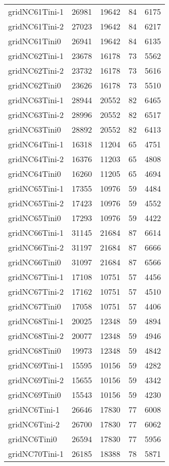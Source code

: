 \begin{longtable}{lrrrr}
gridNC61Tini-1 & 26981 & 19642 & 84 & 6175 \\
gridNC61Tini-2 & 27023 & 19642 & 84 & 6217 \\
gridNC61Tini0 & 26941 & 19642 & 84 & 6135 \\
gridNC62Tini-1 & 23678 & 16178 & 73 & 5562 \\
gridNC62Tini-2 & 23732 & 16178 & 73 & 5616 \\
gridNC62Tini0 & 23626 & 16178 & 73 & 5510 \\
gridNC63Tini-1 & 28944 & 20552 & 82 & 6465 \\
gridNC63Tini-2 & 28996 & 20552 & 82 & 6517 \\
gridNC63Tini0 & 28892 & 20552 & 82 & 6413 \\
gridNC64Tini-1 & 16318 & 11204 & 65 & 4751 \\
gridNC64Tini-2 & 16376 & 11203 & 65 & 4808 \\
gridNC64Tini0 & 16260 & 11205 & 65 & 4694 \\
gridNC65Tini-1 & 17355 & 10976 & 59 & 4484 \\
gridNC65Tini-2 & 17423 & 10976 & 59 & 4552 \\
gridNC65Tini0 & 17293 & 10976 & 59 & 4422 \\
gridNC66Tini-1 & 31145 & 21684 & 87 & 6614 \\
gridNC66Tini-2 & 31197 & 21684 & 87 & 6666 \\
gridNC66Tini0 & 31097 & 21684 & 87 & 6566 \\
gridNC67Tini-1 & 17108 & 10751 & 57 & 4456 \\
gridNC67Tini-2 & 17162 & 10751 & 57 & 4510 \\
gridNC67Tini0 & 17058 & 10751 & 57 & 4406 \\
gridNC68Tini-1 & 20025 & 12348 & 59 & 4894 \\
gridNC68Tini-2 & 20077 & 12348 & 59 & 4946 \\
gridNC68Tini0 & 19973 & 12348 & 59 & 4842 \\
gridNC69Tini-1 & 15595 & 10156 & 59 & 4282 \\
gridNC69Tini-2 & 15655 & 10156 & 59 & 4342 \\
gridNC69Tini0 & 15543 & 10156 & 59 & 4230 \\
gridNC6Tini-1 & 26646 & 17830 & 77 & 6008 \\
gridNC6Tini-2 & 26700 & 17830 & 77 & 6062 \\
gridNC6Tini0 & 26594 & 17830 & 77 & 5956 \\
gridNC70Tini-1 & 26185 & 18388 & 78 & 5871 \\

\end{longtable}
